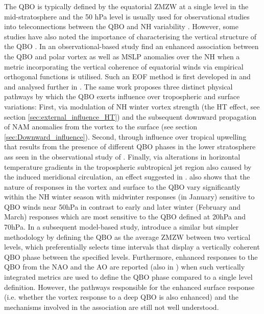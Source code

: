 The QBO is typically defined by the equatorial ZMZW at a single level in the mid-stratosphere and the 50 hPa level is usually used for observational studies into teleconnections between the QBO and NH variability \citep{baldwinQuasiBiennial2001}. However, some studies have also noted the importance of characterising the vertical structure of the QBO \citep{fraedrichEOF1993, wallaceRepresentation1993,  Baldwin98,  Dunkerton2017, graySurface2018b, andrewsObserved2019d}. In an observational-based study \cite{graySurface2018b} find an enhanced association between the QBO and polar vortex as well as MSLP anomalies over the NH when a metric incorporating the vertical coherence of equatorial winds via empirical orthogonal functions is utilised. Such an EOF method is first developed in \cite{fraedrichEOF1993} and \cite{wallaceRepresentation1993} and analysed further in \cite{verena2016a}. The same work proposes three distinct physical pathways by which the QBO exerts influence over tropospheric and surface variations: First, via modulation of NH winter vortex strength (the HT effect, see section \ref{sec:external_influence_HT}) and the subsequent downward propagation of NAM anomalies from the vortex to the surface (see section \ref{sec:Downward_influence}). Second, through influence over tropical upwelling that results from the presence of different QBO phases in the lower stratosphere ass seen in the observational study of \cite{liessRelationship2012}. Finally, via alterations in horizontal temperature gradients in the tropospheric subtropical jet region also caused by the induced meridional circulation, an effect suggested in \cite{garfinkelInfluence2011}. \cite{graySurface2018b} also shows that the nature of responses in the vortex and surface to the QBO vary significantly within the NH winter season with midwinter responses (in January) sensitive to QBO winds near 50hPa in contrast to early and later winter (February and March) responses which are most sensitive to the QBO defined at 20hPa and 70hPa. In a subsequent model-based study, \cite{andrewsObserved2019d} introduce a similar but simpler methodology by defining the QBO as the average ZMZW between two vertical levels, which preferentially selects time intervals that display a vertically coherent QBO phase between the specified levels. Furthermore, enhanced responses to the QBO from the NAO and the AO are reported (also in \cite{andrewsObserved2019d}) when such vertically integrated metrics are used to define the QBO phase compared to a single level definition. However, the pathways responsible for the enhanced surface response (i.e. whether the vortex response to a deep QBO is also enhanced) and the mechanisms involved in the association are still not well understood. 

